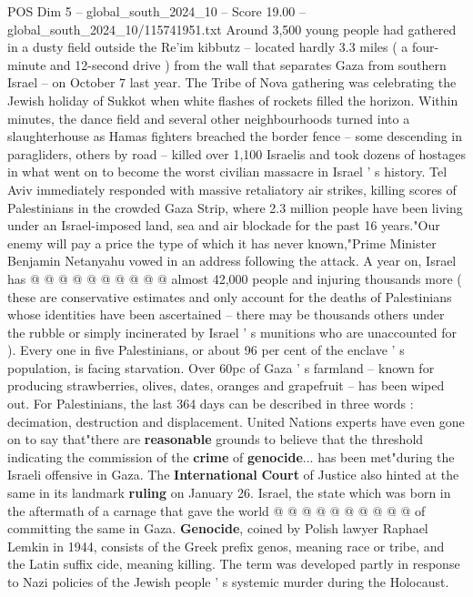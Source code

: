 \begin{textsample}{POS Dim 5 – global\_south\_2024\_10 – Score 19.00 – global\_south\_2024\_10/115741951.txt}  \label{ex:f5_pos_322}
Around 3,500 young people had gathered in a dusty field outside the Re'im kibbutz -- located hardly 3.3 miles ( a four-minute and 12-second drive ) from the wall that separates Gaza from southern Israel -- on October 7 last year.
The Tribe of Nova gathering was celebrating the Jewish holiday of Sukkot when white flashes of rockets filled the horizon.
Within minutes, the dance field and several other neighbourhoods turned into a slaughterhouse as Hamas fighters breached the border fence -- some descending in paragliders, others by road -- killed over 1,100 Israelis and took dozens of hostages in what went on to become the worst civilian massacre in Israel ' s history.
Tel Aviv immediately responded with massive retaliatory air strikes, killing scores of Palestinians in the crowded Gaza Strip, where 2.3 million people have been living under an Israel-imposed land, sea and air blockade for the past 16 years."Our enemy will pay a price the type of which it has never known,"Prime Minister Benjamin Netanyahu vowed in an address following the attack.
A year on, Israel has @ @ @ @ @ @ @ @ @ @ almost 42,000 people and injuring thousands more ( these are conservative estimates and only account for the deaths of Palestinians whose identities have been ascertained -- there may be thousands others under the rubble or simply incinerated by Israel ' s munitions who are unaccounted for ).
Every one in five Palestinians, or about 96 per cent of the enclave ' s population, is facing starvation.
Over 60pc of Gaza ' s farmland -- known for producing strawberries, olives, dates, oranges and grapefruit -- has been wiped out.
For Palestinians, the last 364 days can be described in three words : decimation, destruction and displacement.
United Nations experts have even gone on to say that"there are \textbf{reasonable} grounds to believe that the threshold indicating the commission of the \textbf{crime} of \textbf{genocide}... has been met"during the Israeli offensive in Gaza.
The \textbf{International} \textbf{Court} of Justice also hinted at the same in its landmark \textbf{ruling} on January 26.
Israel, the state which was born in the aftermath of a carnage that gave the world @ @ @ @ @ @ @ @ @ @ of committing the same in Gaza. \textbf{Genocide}, coined by Polish lawyer Raphael Lemkin in 1944, consists of the Greek prefix genos, meaning race or tribe, and the Latin suffix cide, meaning killing.
The term was developed partly in response to Nazi policies of the Jewish people ' s systemic murder during the Holocaust.

\end{textsample}
